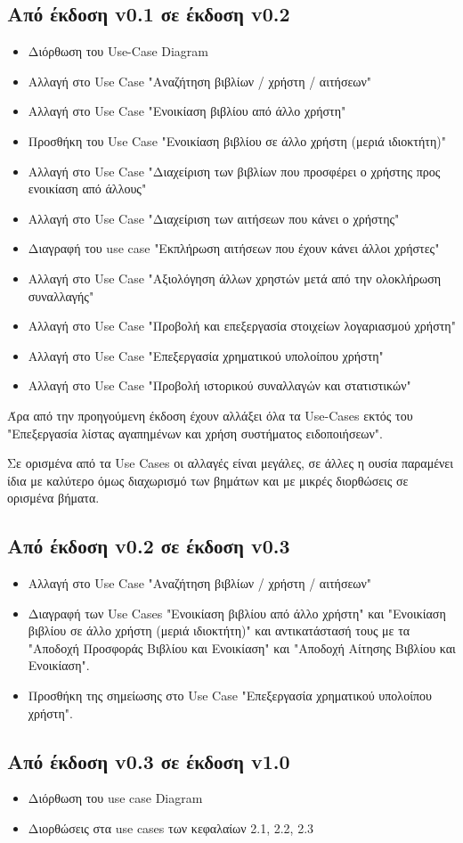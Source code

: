 \documentclass[12pt,a4paper]{article}
\begin{document}
\subsection{Από έκδοση v0.1 σε έκδοση v0.2}
\begin{itemize}
    \item Διόρθωση του Use-Case Diagram
    \item Αλλαγή στο Use Case "Αναζήτηση βιβλίων / χρήστη / αιτήσεων"
    \item Αλλαγή στο Use Case "Ενοικίαση βιβλίου από άλλο χρήστη"
    \item Προσθήκη του Use Case "Ενοικίαση βιβλίου σε άλλο χρήστη (μεριά ιδιοκτήτη)"
    \item Αλλαγή στο Use Case "Διαχείριση των βιβλίων που προσφέρει ο χρήστης προς ενοικίαση από άλλους"
    \item Αλλαγή στο Use Case "Διαχείριση των αιτήσεων που κάνει ο χρήστης"
    \item Διαγραφή του use case "Εκπλήρωση αιτήσεων που έχουν κάνει άλλοι χρήστες"
    \item Αλλαγή στο Use Case "Αξιολόγηση άλλων χρηστών μετά από την ολοκλήρωση συναλλαγής"
    \item Αλλαγή στο Use Case "Προβολή και επεξεργασία στοιχείων λογαριασμού χρήστη"
    \item Αλλαγή στο Use Case "Επεξεργασία χρηματικού υπολοίπου χρήστη"
    \item Αλλαγή στο Use Case "Προβολή ιστορικού συναλλαγών και στατιστικών"
\end{itemize}
Άρα από την προηγούμενη έκδοση έχουν αλλάξει όλα τα Use-Cases εκτός του "Επεξεργασία λίστας αγαπημένων και χρήση συστήματος ειδοποιήσεων".

Σε ορισμένα από τα Use Cases οι αλλαγές είναι μεγάλες, σε άλλες η ουσία παραμένει ίδια με καλύτερο όμως διαχωρισμό των βημάτων και με μικρές διορθώσεις σε ορισμένα βήματα.

\subsection{Από έκδοση v0.2 σε έκδοση v0.3}
\begin{itemize}
    \item Αλλαγή στο Use Case "Αναζήτηση βιβλίων / χρήστη / αιτήσεων"
    \item Διαγραφή των Use Cases "Ενοικίαση βιβλίου από άλλο χρήστη" και "Ενοικίαση βιβλίου σε άλλο χρήστη (μεριά ιδιοκτήτη)" και αντικατάστασή τους με τα "Αποδοχή Προσφοράς Βιβλίου και Ενοικίαση" και "Αποδοχή Αίτησης Βιβλίου και Ενοικίαση".
    \item Προσθήκη της σημείωσης στο Use Case "Επεξεργασία χρηματικού υπολοίπου χρήστη".
\end{itemize}

\subsection{Από έκδοση v0.3 σε έκδοση v1.0}
\begin{itemize}
    \item Διόρθωση του use case Diagram
    \item Διορθώσεις στα use cases των κεφαλαίων 2.1, 2.2, 2.3
\end{itemize}
\end{document}
